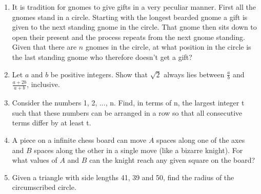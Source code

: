 \documentclass{article}
\begin{document}
\begin{enumerate}
    \item
    It is tradition for gnomes to give gifts in a very peculiar manner. First all the gnomes stand in a circle. Starting with the longest bearded gnome a gift is given to the next standing gnome in the circle. That gnome then sits down to open their present and the process repeats from the next gnome standing. Given that there are $n$ gnomes in the circle, at what position in the circle is the last standing gnome who therefore doesn’t get a gift?
    
    \item
    Let $a$ and $b$ be positive integers. Show that $\sqrt{2}$ always lies between $\frac{a}{b}$ and $\frac{a+2b}{a+b}$, inclusive.
    
    \item
    Consider the numbers 1, 2, ..., n. Find, in terms of n, the largest integer t such that these numbers can be arranged in a row so that all consecutive terms differ by at least t.
    
    \item
    A piece on a infinite chess board can move $A$ spaces along one of the axes and $B$ spaces along the other in a single move (like a bizarre knight). For what values of $A$ and $B$ can the knight reach any given square on the board?
    
    \item
    Given a triangle with side lengths 41, 39 and 50, find the radius of the circumscribed circle.
    
    
    
    
\end{enumerate}
\end{document}
